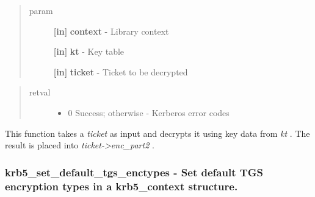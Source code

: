 \documentclass[letterpaper,10pt,english]{sphinxmanual}
\begin{document}
\begin{fulllineitems}
\label{appdev/refs/api/krb5_server_decrypt_ticket_keytab:krb5_server_decrypt_ticket_keytab}
\end{fulllineitems}

\begin{quote}\begin{description}
\item[{param}] \leavevmode
\textbf{{[}in{]}} \textbf{context} - Library context

\textbf{{[}in{]}} \textbf{kt} - Key table

\textbf{{[}in{]}} \textbf{ticket} - Ticket to be decrypted

\end{description}\end{quote}
\begin{quote}\begin{description}
\item[{retval}] \leavevmode\begin{itemize}
\item {} 
0   Success; otherwise - Kerberos error codes

\end{itemize}

\end{description}\end{quote}

This function takes a \emph{ticket} as input and decrypts it using key data from \emph{kt} . The result is placed into \emph{ticket-\textgreater{}enc\_part2} .


\subsubsection{krb5\_set\_default\_tgs\_enctypes -  Set default TGS encryption types in a krb5\_context structure.}
\label{appdev/refs/api/krb5_set_default_tgs_enctypes::doc}\label{appdev/refs/api/krb5_set_default_tgs_enctypes:krb5-set-default-tgs-enctypes-set-default-tgs-encryption-types-in-a-krb5-context-structure}
\end{document}

